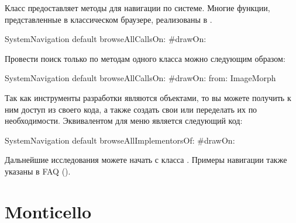 \documentclass[a4paper,10pt,twoside]{book}
\begin{document}

Класс  предоставляет методы для навигации по системе. Многие функции, представленные в классическом браузере, реализованы в .


\begin{code}{}
SystemNavigation default browseAllCallsOn: #drawOn:
\end{code}

Провести поиск только по методам одного класса можно следующим образом:

\begin{code}{}
SystemNavigation default browseAllCallsOn: #drawOn: from: ImageMorph
\end{code}


Так как инструменты разработки являются объектами, то вы можете получить к ним доступ из своего кода, а также создать свои или переделать их по необходимости. Эквивалентом для меню   является следующий код:

\begin{code}{}
SystemNavigation default browseAllImplementorsOf: #drawOn:
\end{code}


Дальнейшие исследования можете начать с класса . Примеры навигации также указаны в FAQ ().

\section{Monticello}
\end{document}
